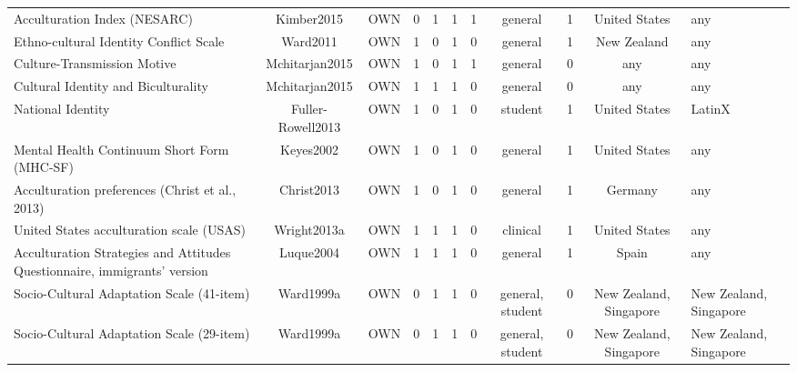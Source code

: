\begin{longtable}[l]{lclclclclcl}
Acculturation Index (NESARC) & Kimber2015 & OWN & 0 & 1 & 1 & 1 & general & 1 & United States & any\\
Ethno-cultural Identity Conflict Scale & Ward2011 & OWN & 1 & 0 & 1 & 0 & general & 1 & New Zealand & any\\
Culture-Transmission Motive & Mchitarjan2015 & OWN & 1 & 0 & 1 & 1 & general & 0 & any & any\\
Cultural Identity and Biculturality & Mchitarjan2015 & OWN & 1 & 1 & 1 & 0 & general & 0 & any & any\\
National Identity & Fuller-Rowell2013 & OWN & 1 & 0 & 1 & 0 & student & 1 & United States & LatinX\\
Mental Health Continuum Short Form (MHC-SF) & Keyes2002 & OWN & 1 & 0 & 1 & 0 & general & 1 & United States & any\\
Acculturation preferences (Christ et al., 2013) & Christ2013 & OWN & 1 & 0 & 1 & 0 & general & 1 & Germany & any\\
United States acculturation scale (USAS) & Wright2013a & OWN & 1 & 1 & 1 & 0 & clinical & 1 & United States & any\\
Acculturation Strategies and Attitudes Questionnaire, immigrants’ version & Luque2004 & OWN & 1 & 1 & 1 & 0 & general & 1 & Spain & any\\
Socio-Cultural Adaptation Scale (41-item) & Ward1999a & OWN & 0 & 1 & 1 & 0 & general, student & 0 & New Zealand, Singapore & New Zealand, Singapore\\
Socio-Cultural Adaptation Scale (29-item) & Ward1999a & OWN & 0 & 1 & 1 & 0 & general, student & 0 & New Zealand, Singapore & New Zealand, Singapore\\*
\end{longtable}
